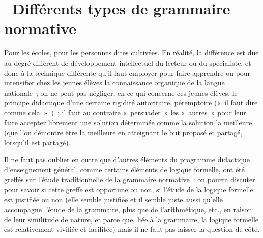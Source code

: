 \documentclass[french,twoside]{book} %
\begin{document}
\section[{ Différents types de grammaire normative}]{ Différents types de grammaire normative}
\noindent Pour les écoles, pour les personnes dites cultivées. En réalité, la différence est due au degré différent de développement intellectuel du lecteur ou du spécialiste, et donc à la technique différente qu’il faut employer pour faire apprendre ou pour intensifier chez les jeunes élèves la connaissance organique de la langue nationale ; on ne peut pas négliger, en ce qui concerne ces jeunes élèves, le principe didactique d’une certaine rigidité autoritaire, péremptoire (« il faut dire comme cela » ) ; il faut au contraire « persuader » les « autres » pour leur faire accepter librement une solution déterminée comme la solution la meilleure (que l’on démontre être la meilleure en atteignant le but proposé et partagé, lorsqu’il est partagé).\par
Il ne faut pas oublier en outre que d’autres éléments du programme didactique d’enseignement général, comme certains éléments de logique formelle, ont été greffés sur l’étude traditionnelle de la grammaire normative : on pourra discuter pour savoir si cette greffe est opportune ou non, si l’étude de la logique formelle est justifiée ou non (elle semble justifiée et il semble juste aussi qu’elle accompagne l’étude de la grammaire, plus que de l’arithmétique, etc., en raison de leur similitude de nature, et parce que, liée à la grammaire, la logique formelle est relativement vivifiée et facilitée) mais il ne faut pas laisser la question de côté.
\end{document}
